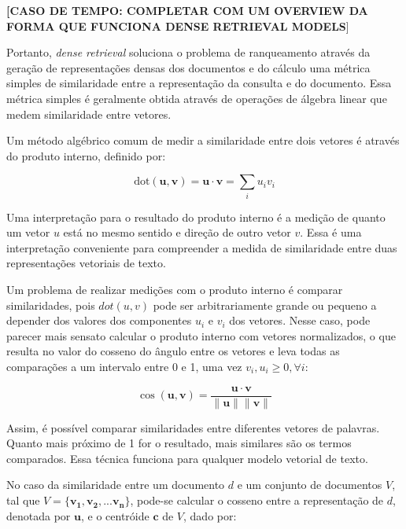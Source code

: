 \documentclass[
	12pt,				%
	openright,			%
	oneside,			%
	a4paper,			%
	english,			%
	french,				%
	spanish,			%
	brazil				%
	]{abntex2}
\begin{document}
\textbf{[CASO DE TEMPO: COMPLETAR COM UM OVERVIEW DA FORMA QUE FUNCIONA DENSE RETRIEVAL MODELS}]

Portanto, \textit{dense retrieval} soluciona o problema de ranqueamento através da geração de representações densas dos documentos e do cálculo uma métrica simples de similaridade entre a representação da consulta e do documento.
Essa métrica simples é geralmente obtida através de operações de álgebra linear que medem similaridade entre vetores.

Um método algébrico comum de medir a similaridade entre dois vetores é através do produto interno, definido por:

\begin{equation}
\text{dot}(\mathbf{u}, \mathbf{v})  = \mathbf{u} \cdot \mathbf{v} = \sum_{i}u_{i}v_{i}
\label{eq:dot_product}
\end{equation}

Uma interpretação para o resultado do produto interno é a medição de quanto um vetor $u$ está no mesmo sentido e direção de outro vetor $v$. Essa é uma interpretação conveniente para compreender a medida de similaridade entre duas representações vetoriais de texto.

Um problema de realizar medições com o produto interno é comparar similaridades, pois $dot(u,v)$ pode ser arbitrariamente grande ou pequeno a depender dos valores dos componentes $u_i$ e $v_i$ dos vetores. Nesse caso, pode parecer mais sensato calcular o produto interno com vetores normalizados, o que resulta no valor do cosseno do ângulo entre os vetores e leva todas as comparações
a um intervalo entre 0 e 1, uma vez $v_i, u_i \geq 0, \forall i$:

\begin{equation}
\cos (\mathbf{u}, \mathbf{v})  = \frac{\mathbf{u} \cdot \mathbf{v}}{\|\mathbf{u}\| \|\mathbf{v}\|}
\label{eq:cosine_similarity}
\end{equation}

Assim, é possível comparar similaridades entre diferentes vetores de palavras.
Quanto mais próximo de 1 for o resultado, mais similares são os termos comparados.
Essa técnica funciona para qualquer modelo vetorial de texto.

No caso da similaridade entre um documento $d$ e um conjunto de documentos $V$, tal que $V = \{\mathbf{v_1}, \mathbf{v_2}, ... \mathbf{v_n}\}$,
pode-se calcular o cosseno entre a representação de $d$, denotada por $\mathbf{u}$, e o centróide $\mathbf{c}$ de $V$, dado por:
\end{document}

